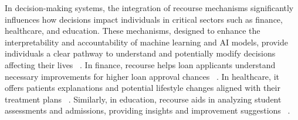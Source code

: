 


In decision-making systems, the integration of recourse mechanisms significantly influences how decisions impact individuals in critical sectors such as finance, healthcare, and education. These mechanisms, designed to enhance the interpretability and accountability of machine learning and AI models, provide individuals a clear pathway to understand and potentially modify decisions affecting their lives ~\cite{gunning2019xai,arrieta2020explainable,guidotti2018survey}. In finance, recourse helps loan applicants understand necessary improvements for higher loan approval chances ~\cite{barocas2017fairness}. In healthcare, it offers patients explanations and potential lifestyle changes aligned with their treatment plans ~\cite{bastani2017interpretability,bertossi2020asp,liang2014deep}. Similarly, in education, recourse aids in analyzing student assessments and admissions, providing insights and improvement suggestions ~\cite{fiok2022explainable,khosravi2022explainable}.

